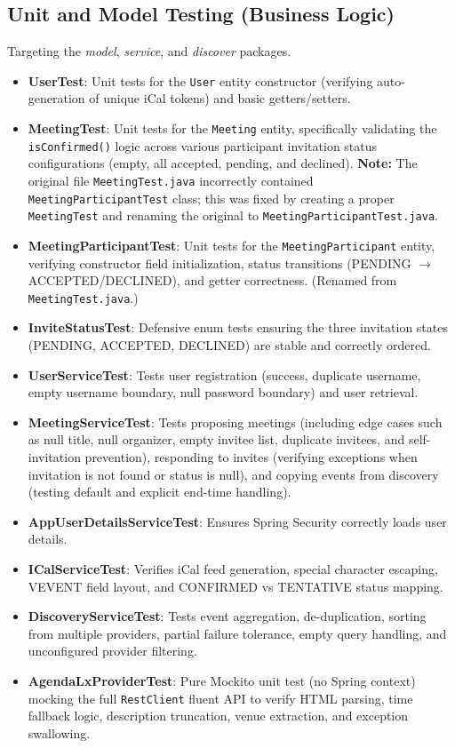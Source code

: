\documentclass[11pt]{article}
\begin{document}
  \subsection{Unit and Model Testing (Business Logic)}
  Targeting the \textit{model}, \textit{service}, and \textit{discover} packages.
  \begin{itemize}
    \item \textbf{UserTest}: Unit tests for the \texttt{User} entity constructor (verifying auto-generation of unique iCal tokens) and basic getters/setters.
    \item \textbf{MeetingTest}: Unit tests for the \texttt{Meeting} entity, specifically validating the \texttt{isConfirmed()} logic across various participant invitation status configurations (empty, all accepted, pending, and declined). \textbf{Note:} The original file \texttt{MeetingTest.java} incorrectly contained \texttt{MeetingParticipantTest} class; this was fixed by creating a proper \texttt{MeetingTest} and renaming the original to \texttt{MeetingParticipantTest.java}.
    \item \textbf{MeetingParticipantTest}: Unit tests for the \texttt{MeetingParticipant} entity, verifying constructor field initialization, status transitions (PENDING $\rightarrow$ ACCEPTED/DECLINED), and getter correctness. (Renamed from \texttt{MeetingTest.java}.)
    \item \textbf{InviteStatusTest}: Defensive enum tests ensuring the three invitation states (PENDING, ACCEPTED, DECLINED) are stable and correctly ordered.
    \item \textbf{UserServiceTest}: Tests user registration (success, duplicate username, empty username boundary, null password boundary) and user retrieval.
    \item \textbf{MeetingServiceTest}: Tests proposing meetings (including edge cases such as null title, null organizer, empty invitee list, duplicate invitees, and self-invitation prevention), responding to invites (verifying exceptions when invitation is not found or status is null), and copying events from discovery (testing default and explicit end-time handling).
    \item \textbf{AppUserDetailsServiceTest}: Ensures Spring Security correctly loads user details.
    \item \textbf{ICalServiceTest}: Verifies iCal feed generation, special character escaping, VEVENT field layout, and CONFIRMED vs TENTATIVE status mapping.
    \item \textbf{DiscoveryServiceTest}: Tests event aggregation, de-duplication, sorting from multiple providers, partial failure tolerance, empty query handling, and unconfigured provider filtering.
    \item \textbf{AgendaLxProviderTest}: Pure Mockito unit test (no Spring context) mocking the full \texttt{RestClient} fluent API to verify HTML parsing, time fallback logic, description truncation, venue extraction, and exception swallowing.
  \end{itemize}
\end{document}

